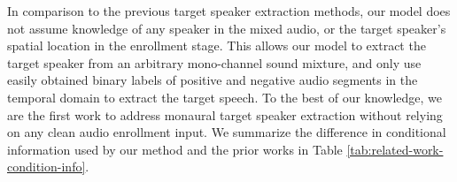 In comparison to the previous target speaker extraction methods, our model does not assume knowledge of any speaker in the mixed audio, or the target speaker's spatial location in the enrollment stage. This allows our model to extract the target speaker from an arbitrary mono-channel sound mixture, and only use easily obtained binary labels of positive and negative audio segments in the temporal domain to extract the target speech. To the best of our knowledge, we are the first work to address monaural target speaker extraction without relying on any clean audio enrollment input. We summarize the difference in conditional information used by our method and the prior works in Table \ref{tab:related-work-condition-info}.



